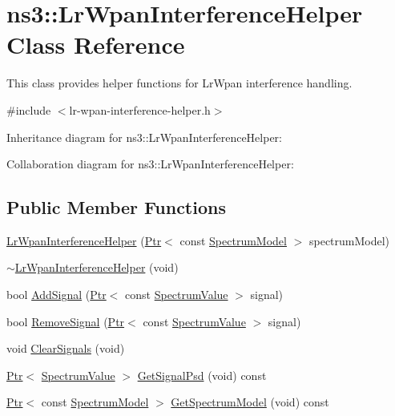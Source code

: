 \hypertarget{classns3_1_1LrWpanInterferenceHelper}{}\section{ns3\+:\+:Lr\+Wpan\+Interference\+Helper Class Reference}
\label{classns3_1_1LrWpanInterferenceHelper}


This class provides helper functions for Lr\+Wpan interference handling.  




{\ttfamily \#include $<$lr-\/wpan-\/interference-\/helper.\+h$>$}



Inheritance diagram for ns3\+:\+:Lr\+Wpan\+Interference\+Helper\+:


Collaboration diagram for ns3\+:\+:Lr\+Wpan\+Interference\+Helper\+:
\subsection*{Public Member Functions}
\begin{DoxyCompactItemize}
\item 
\hyperlink{classns3_1_1LrWpanInterferenceHelper_ab99a6a880665dc0b628912ff14d7e0b8}{Lr\+Wpan\+Interference\+Helper} (\hyperlink{classns3_1_1Ptr}{Ptr}$<$ const \hyperlink{classns3_1_1SpectrumModel}{Spectrum\+Model} $>$ spectrum\+Model)
\item 
\hyperlink{classns3_1_1LrWpanInterferenceHelper_aeeabdd752b1964596a9d47d0810031c0}{$\sim$\+Lr\+Wpan\+Interference\+Helper} (void)
\item 
bool \hyperlink{classns3_1_1LrWpanInterferenceHelper_afbf84fd3868b60e9947c7c8d471ad3b1}{Add\+Signal} (\hyperlink{classns3_1_1Ptr}{Ptr}$<$ const \hyperlink{classns3_1_1SpectrumValue}{Spectrum\+Value} $>$ signal)
\item 
bool \hyperlink{classns3_1_1LrWpanInterferenceHelper_a0fe41ebc6735e28398b3037a3263ef71}{Remove\+Signal} (\hyperlink{classns3_1_1Ptr}{Ptr}$<$ const \hyperlink{classns3_1_1SpectrumValue}{Spectrum\+Value} $>$ signal)
\item 
void \hyperlink{classns3_1_1LrWpanInterferenceHelper_a6fcf61ae17c1377f6857fedfb42482b6}{Clear\+Signals} (void)
\item 
\hyperlink{classns3_1_1Ptr}{Ptr}$<$ \hyperlink{classns3_1_1SpectrumValue}{Spectrum\+Value} $>$ \hyperlink{classns3_1_1LrWpanInterferenceHelper_a28fdd385a960be2d8fa43bfde4356275}{Get\+Signal\+Psd} (void) const 
\item 
\hyperlink{classns3_1_1Ptr}{Ptr}$<$ const \hyperlink{classns3_1_1SpectrumModel}{Spectrum\+Model} $>$ \hyperlink{classns3_1_1LrWpanInterferenceHelper_a0721ca281449222184e212d71593aabf}{Get\+Spectrum\+Model} (void) const 
\end{DoxyCompactItemize}
